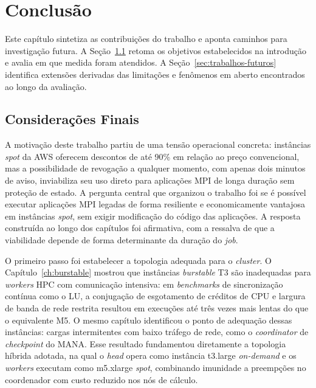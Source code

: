\chapter{Conclusão}
\label{ch:conclusao}

Este capítulo sintetiza as contribuições do trabalho e aponta caminhos para investigação
futura. A Seção~\ref{sec:consideracoes-finais} retoma os objetivos estabelecidos na
introdução e avalia em que medida foram atendidos. A Seção~\ref{sec:trabalhos-futuros}
identifica extensões derivadas das limitações e fenômenos em aberto encontrados ao
longo da avaliação.

\section{Considerações Finais}
\label{sec:consideracoes-finais}

A motivação deste trabalho partiu de uma tensão operacional concreta: instâncias
\textit{spot} da AWS oferecem descontos de até 90\% em relação ao preço convencional,
mas a possibilidade de revogação a qualquer momento, com apenas dois minutos de aviso,
inviabiliza seu uso direto para aplicações MPI de longa duração sem proteção de estado.
A pergunta central que organizou o trabalho foi se é possível executar aplicações MPI
legadas de forma resiliente e economicamente vantajosa em instâncias \textit{spot}, sem
exigir modificação do código das aplicações. A resposta construída ao longo dos
capítulos foi afirmativa, com a ressalva de que a viabilidade depende de forma
determinante da duração do \textit{job}.

O primeiro passo foi estabelecer a topologia adequada para o \textit{cluster}. O
Capítulo~\ref{ch:burstable} mostrou que instâncias \textit{burstable} T3 são
inadequadas para \textit{workers} HPC com comunicação intensiva: em \textit{benchmarks}
de sincronização contínua como o LU, a conjugação de esgotamento de créditos de CPU e
largura de banda de rede restrita resultou em execuções até três vezes mais lentas do
que o equivalente M5. O mesmo capítulo identificou o ponto de adequação dessas
instâncias: cargas intermitentes com baixo tráfego de rede, como o \textit{coordinator}
de \textit{checkpoint} do MANA. Esse resultado fundamentou diretamente a topologia
híbrida adotada, na qual o \textit{head} opera como instância t3.large
\textit{on-demand} e os \textit{workers} executam como m5.xlarge \textit{spot},
combinando imunidade a preempções no coordenador com custo reduzido nos nós de cálculo.

